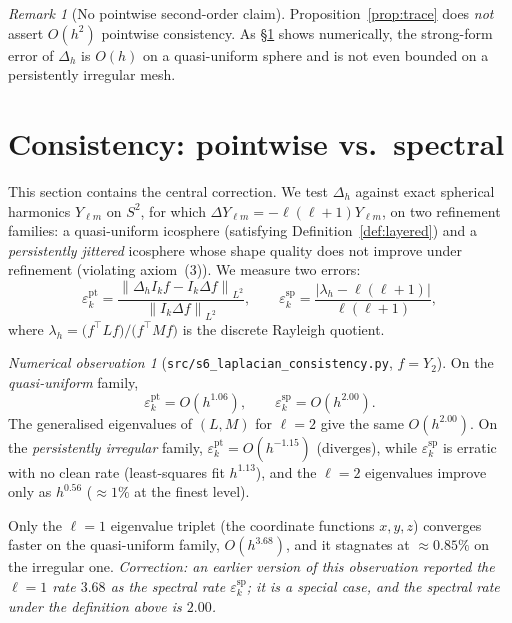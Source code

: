 \documentclass[11pt]{article}
\theoremstyle{plain}
\theoremstyle{definition}
\theoremstyle{remark}
\newtheorem{remark}[theorem]{Remark}
\newtheorem{observation}[theorem]{Numerical observation}
\newcommand{\Lap}{\Delta}
\newcommand{\norm}[1]{\left\lVert #1 \right\rVert}
\newcommand{\Order}{O}
\begin{document}
\begin{remark}[No pointwise second-order claim]
Proposition~\ref{prop:trace} does \emph{not} assert $\Order(h^2)$ pointwise
consistency. As \S\ref{sec:consistency} shows numerically, the strong-form error
of $\Lap_h$ is $\Order(h)$ on a quasi-uniform sphere and is not even bounded on a
persistently irregular mesh.
\end{remark}

\section{Consistency: pointwise vs.\ spectral}
\label{sec:consistency}
This section contains the central correction. We test $\Lap_h$ against exact
spherical harmonics $Y_{\ell m}$ on $S^2$, for which $\Lap Y_{\ell m}
=-\ell(\ell+1)Y_{\ell m}$, on two refinement families: a quasi-uniform icosphere
(satisfying Definition~\ref{def:layered}) and a \emph{persistently jittered}
icosphere whose shape quality does not improve under refinement (violating
axiom~(3)). We measure two errors:
\[
\varepsilon^{\mathrm{pt}}_k=\frac{\norm{\Lap_h I_k f-I_k\Lap f}_{L^2}}{\norm{I_k\Lap f}_{L^2}},
\qquad
\varepsilon^{\mathrm{sp}}_k=\frac{|\lambda_h-\ell(\ell+1)|}{\ell(\ell+1)},
\]
where $\lambda_h=\big(f^{\!\top}Lf\big)/\big(f^{\!\top}Mf\big)$ is the discrete
Rayleigh quotient.

\begin{observation}[\texttt{src/s6\_laplacian\_consistency.py}, $f=Y_{2}$]
\label{obs:s6}
On the \emph{quasi-uniform} family,
\[
\varepsilon^{\mathrm{pt}}_k=\Order(h^{1.06}),\qquad
\varepsilon^{\mathrm{sp}}_k=\Order(h^{2.00}).
\]
The generalised eigenvalues of $(L,M)$ for $\ell=2$ give the same
$\Order(h^{2.00})$. On the \emph{persistently irregular} family,
$\varepsilon^{\mathrm{pt}}_k=\Order(h^{-1.15})$ (diverges), while
$\varepsilon^{\mathrm{sp}}_k$ is erratic with no clean rate (least-squares fit
$h^{1.13}$), and the $\ell=2$ eigenvalues improve only as $h^{0.56}$
($\approx 1\%$ at the finest level).

Only the $\ell=1$ eigenvalue triplet (the coordinate functions $x,y,z$)
converges faster on the quasi-uniform family, $\Order(h^{3.68})$, and it
stagnates at $\approx 0.85\%$ on the irregular one. \emph{Correction: an
earlier version of this observation reported the $\ell=1$ rate $3.68$ as the
spectral rate $\varepsilon^{\mathrm{sp}}_k$; it is a special case, and the
spectral rate under the definition above is $2.00$.}
\end{observation}
\end{document}
